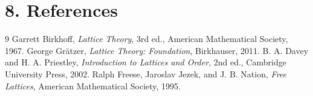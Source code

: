 \section*{8. References}

\begin{thebibliography}{9}
 Garrett Birkhoff, \emph{Lattice Theory}, 3rd ed., American Mathematical Society, 1967.
 George Gr\"atzer, \emph{Lattice Theory: Foundation}, Birkhauser, 2011.
 B. A. Davey and H. A. Priestley, \emph{Introduction to Lattices and Order}, 2nd ed., Cambridge University Press, 2002.
 Ralph Freese, Jaroslav Jezek, and J. B. Nation, \emph{Free Lattices}, American Mathematical Society, 1995.
\end{thebibliography}